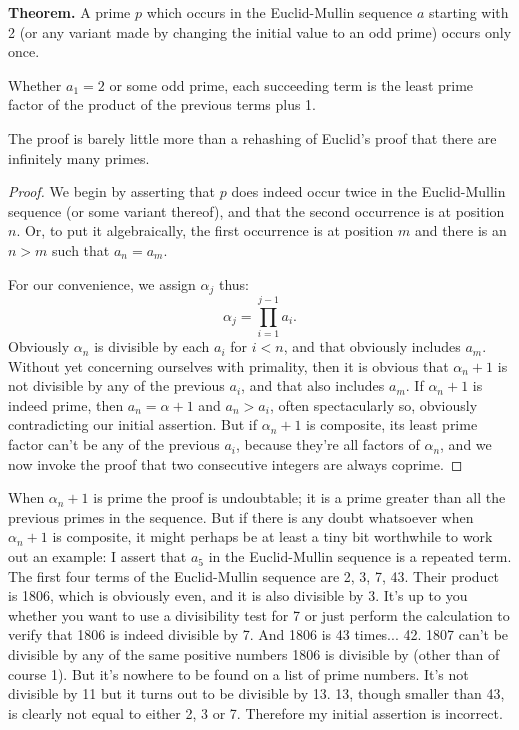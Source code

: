 \documentclass[12pt]{article}
\begin{document}
{\bf Theorem.} A prime $p$ which occurs in the Euclid-Mullin sequence $a$ starting with 2 (or any variant made by changing the initial value to an odd prime) occurs only once.

Whether $a_1 = 2$ or some odd prime, each succeeding term is the least prime factor of the product of the previous terms plus 1.

The proof is barely little more than a rehashing of Euclid's proof that there are infinitely many primes.

\begin{proof}
We begin by asserting that $p$ does indeed occur twice in the Euclid-Mullin sequence (or some variant thereof), and that the second occurrence is at position $n$. Or, to put it algebraically, the first occurrence is at position $m$ and there is an $n > m$ such that $a_n = a_m$. 

For our convenience, we assign $\alpha_j$ thus: $$\alpha_j = \prod_{i = 1}^{j - 1} a_i.$$ Obviously $\alpha_n$ is divisible by each $a_i$ for $i < n$, and that obviously includes $a_m$. Without yet concerning ourselves with primality, then it is obvious that $\alpha_n + 1$ is not divisible by any of the previous $a_i$, and that also includes $a_m$. If $\alpha_n + 1$ is indeed prime, then $a_n = \alpha + 1$ and $a_n > a_i$, often spectacularly so, obviously contradicting our initial assertion. But if $\alpha_n + 1$ is composite, its least prime factor can't be any of the previous $a_i$, because they're all factors of $\alpha_n$, and we now invoke the proof that two consecutive integers are always coprime.
\end{proof}

When $\alpha_n + 1$ is prime the proof is undoubtable; it is a prime greater than all the previous primes in the sequence. But if there is any doubt whatsoever when $\alpha_n + 1$ is composite, it might perhaps be at least a tiny bit worthwhile to work out an example: I assert that $a_5$ in the Euclid-Mullin sequence is a repeated term. The first four terms of the Euclid-Mullin sequence are 2, 3, 7, 43. Their product is 1806, which is obviously even, and it is also divisible by 3. It's up to you whether you want to use a divisibility test for 7 or just perform the calculation to verify that 1806 is indeed divisible by 7. And 1806 is 43 times... 42. 1807 can't be divisible by any of the same positive numbers 1806 is divisible by (other than of course 1). But it's nowhere to be found on a list of prime numbers. It's not divisible by 11 but it turns out to be divisible by 13. 13, though smaller than 43, is clearly not equal to either 2, 3 or 7. Therefore my initial assertion is incorrect.
\end{document}
